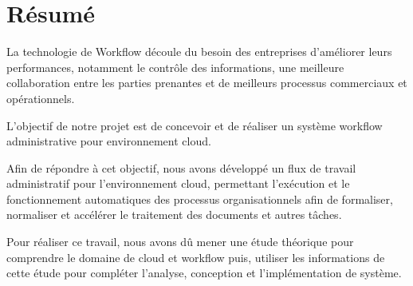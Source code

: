 \chapter*{Résumé}



La technologie de Workflow découle du besoin des entreprises d’améliorer leurs performances, notamment le contrôle des informations, une meilleure collaboration entre les parties prenantes et de meilleurs processus commerciaux et opérationnels.

L'objectif de notre projet est de concevoir et de réaliser un système workflow administrative  pour environnement cloud.
 

Afin de répondre à cet objectif,  nous avons développé un flux de travail administratif pour l'environnement cloud, permettant l'exécution et le fonctionnement automatiques des processus organisationnels afin de formaliser, normaliser et accélérer le traitement des documents et autres tâches.

Pour réaliser ce travail, nous avons dû mener une étude théorique pour comprendre le domaine de cloud  et workflow  puis, utiliser les informations de cette étude pour compléter l'analyse, conception et l'implémentation de système.






